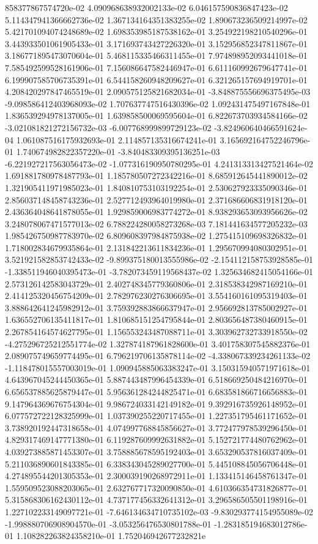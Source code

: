 858377867574720e-02	4.090968638932002133e-02	6.046157590836847423e-02	5.114347941366662736e-02	1.367134164351383255e-02	1.890673236509214997e-02	5.421701094074248689e-02	1.698353985187538162e-01	3.254922198210540296e-01	3.443933501061905433e-01	3.171693743427226320e-01	3.152956852347811867e-01	3.186771895473070604e-01	5.468115335466311455e-01	7.974898952093441018e-01	7.585492599528161906e-01	7.156086647582446947e-01	6.611160992679647741e-01	6.199907585706735391e-01	6.544158260948209627e-01	6.321265157694919701e-01	4.208420297847465519e-01	2.090575125821682034e-01	-3.848875556696375495e-03	-9.098586412403968093e-02	1.707637747516430396e-02	1.092431475497167848e-01	1.836539294978137005e-01	1.639858500069595604e-01	6.822673703934584166e-02	-3.021081821272156732e-03	-6.007768999899729123e-02	-3.824960640466591624e-04	1.061087516175932693e-01	2.114857135316674241e-01	3.165692164752246796e-01	1.740674982822357220e-01	-3.840483309395136251e-03	-6.221927217563056473e-02	-1.077316190950780295e-01	4.241313313427521464e-02	1.691881780978487793e-01	1.185780507272342216e-01	8.685912645441890012e-02	1.321905411971985023e-01	1.840810753103192254e-01	2.530627923335090346e-01	2.856037148458743236e-01	2.527712493964019980e-01	2.371686606831918120e-01	2.436364048641878055e-01	1.929859006983774272e-01	8.938293653093956626e-02	3.248078067471577013e-02	6.788224280058273268e-03	7.181441634577205232e-03	1.985426750987783970e-02	6.809608397984875938e-02	1.275415109698326832e-01	1.718002834679935864e-01	2.131842213611834236e-01	1.295670994080302951e-01	3.521921582853742433e-02	-9.899375180013555986e-02	-2.154112158753928585e-01	-1.338511946040395473e-01	-3.782073459119568437e-02	1.325634682415054166e-01	2.573126142583043729e-01	2.402748345779360806e-01	2.318538342987169210e-01	2.414125320456754209e-01	2.782976230276306695e-01	3.554160161095319403e-01	3.888642641245982912e-01	3.759392883866637947e-01	2.956692813785002927e-01	1.636552706135411817e-01	1.810685151254795844e-01	2.803656487380460915e-01	2.267854164574627795e-01	1.156553243487088711e-01	3.303962732733918550e-02	-4.275296725212551774e-02	1.327874187961828600e-01	3.401758307545882376e-01	2.089075749659774495e-01	6.796219706135878114e-02	-4.338067339234261133e-02	-1.118478015557003019e-01	1.090945885063383247e-01	3.150315940571971618e-01	4.643967045244450365e-01	5.887443487996454339e-01	6.518669250484216970e-01	6.656537885625879447e-01	5.956361284244825471e-01	6.683581866716656883e-01	9.147964369676754304e-01	9.986724033142149182e-01	9.392916735926148952e-01	6.077572722128325999e-01	1.037390255220717455e-01	1.227351795461171652e-01	3.738920192447318658e-01	4.074997768845856627e-01	3.772477978539296450e-01	4.829317469147771380e-01	6.119287609992631882e-01	5.152721774480762962e-01	4.039273885871453307e-01	3.758885678595192403e-01	3.653290537816037409e-01	5.211036890601843385e-01	6.338343045289027700e-01	5.445108845056706448e-01	4.274895544201305353e-01	2.300039190268972911e-01	1.133415146458761347e-01	1.559509523088203065e-01	2.632767717320090850e-01	4.610366354731826877e-01	5.315868306162430112e-01	4.737177456332641312e-01	3.296586505501198916e-01	1.227102233149097721e-01	-7.646134634710735102e-03	-9.830293774154955089e-02	-1.998880706908904570e-01	-3.053256476530801788e-01	-1.283185194683012786e-01	1.108282263824358210e-01	1.752046942677232821e